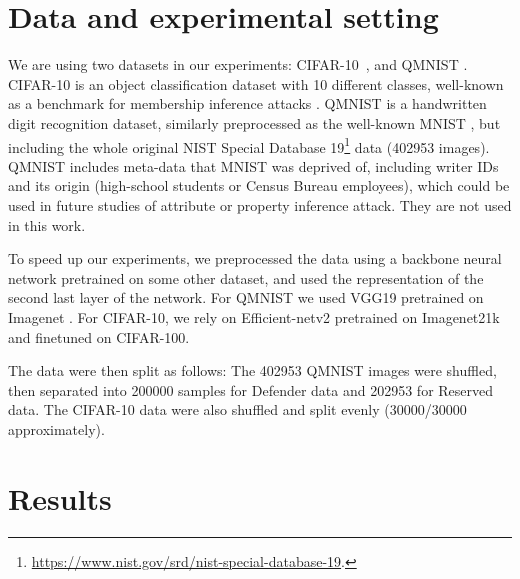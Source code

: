 \documentclass[letterpaper]{article}
\begin{document}

\section{Data and experimental setting}

We are using two datasets in our experiments: CIFAR-10~\cite{krizhevsky2009learning}, and QMNIST \cite{qmnist-2019}. CIFAR-10 is an object classification dataset with 10 different classes, well-known as a benchmark for membership inference attacks \cite{rahman2018membership,hilprecht2019reconstruction,shokri2017membership}.
QMNIST \cite{qmnist-2019} is a handwritten digit recognition dataset, similarly preprocessed as the well-known MNIST \cite{lecun1998gradient}, but including the whole original NIST Special Database 19\footnote{\url{https://www.nist.gov/srd/nist-special-database-19}.} data (402953 images).
QMNIST includes meta-data that MNIST was deprived of, including writer IDs and its origin (high-school students or Census Bureau employees), which could be used in future studies of attribute or property inference attack. They are not used in this work.

To speed up our experiments, we preprocessed the data using a backbone neural network pretrained on some other dataset, and used the representation of the second last layer of the network. For QMNIST we used VGG19 \cite{simonyan2014very} pretrained on Imagenet \cite{deng2009imagenet}.
For CIFAR-10, we rely on Efficient-netv2 \cite{tan2021efficientnetv2} pretrained on Imagenet21k and finetuned on CIFAR-100.

The data were then split as follows:
The 402953 QMNIST images were shuffled, then separated into 200000 samples for Defender data and 202953 for Reserved data.
The CIFAR-10 data were also shuffled and split evenly (30000/30000 approximately).



\section{Results}
\label{sec:results}
\end{document}

